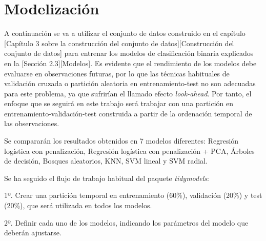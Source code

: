 \documentclass[12pt,a4paper,]{book}
\title{}
\author{Nombre Completo Autor}
\date{18/11/2021}
\def\ifdoblecara{} %
\def\ifprincipal{} %
\let\ifprincipal\undefined %
\numberwithin{dummy}{section}
\theoremstyle{ocrenumbox}
\theoremstyle{blacknumex}
\theoremstyle{blacknumbox}
\theoremstyle{ocrenum}
\theoremstyle{ocrenum}
\begin{document}




\raggedbottom

\ifdefined\ifprincipal
\else
\setlength{\parindent}{1em}
\pagestyle{fancy}
\setcounter{tocdepth}{4}
\tableofcontents

\fi

\ifdefined\ifdoblecara
\fancyhead{}{}
\fancyhead[LE,RO]{\scriptsize\rightmark}
\fancyfoot[LO,RE]{\scriptsize\slshape \leftmark}
\fancyfoot[C]{}
\fancyfoot[LE,RO]{\footnotesize\thepage}
\else
\fancyhead{}{}
\fancyhead[RO]{\scriptsize\rightmark}
\fancyfoot[LO]{\scriptsize\slshape \leftmark}
\fancyfoot[C]{}
\fancyfoot[RO]{\footnotesize\thepage}
\fi

\renewcommand{\headrulewidth}{0.4pt}
\renewcommand{\footrulewidth}{0.4pt}

\hypertarget{modelizaciuxf3n}{%
\chapter{Modelización}\label{modelizaciuxf3n}}

A continuación se va a utilizar el conjunto de datos construido en el
capítulo {[}Capítulo 3 sobre la construcción del conjunto de
datos{]}{[}Construcción del conjunto de datos{]} para entrenar los
modelos de clasificación binaria explicados en la {[}Sección
2.3{]}{[}Modelos{]}. Es evidente que el rendimiento de los modelos debe
evaluarse en observaciones futuras, por lo que las técnicas habituales
de validación cruzada o partición aleatoria en entrenamiento-test no son
adecuadas para este problema, ya que sufrirían el llamado efecto
\emph{look-ahead}. Por tanto, el enfoque que se seguirá en este trabajo
será trabajar con una partición en entrenamiento-validación-test
construida a partir de la ordenación temporal de las observaciones.

Se compararán los resultados obtenidos en 7 modelos diferentes:
Regresión logística con penalización, Regresión logística con
penalización + PCA, Árboles de decisión, Bosques aleatorios, KNN, SVM
lineal y SVM radial.

Se ha seguido el flujo de trabajo habitual del paquete
\emph{tidymodels}:

1º. Crear una partición temporal en entrenamiento (60\%), validación
(20\%) y test (20\%), que será utilizada en todos los modelos.

2º. Definir cada uno de los modelos, indicando los parámetros del modelo
que deberán ajustarse.
\end{document}
